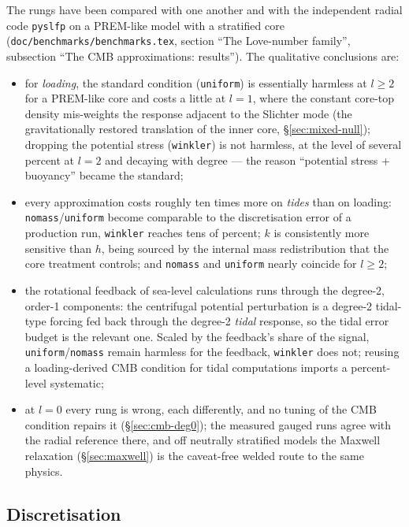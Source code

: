 \documentclass[11pt]{article}
\numberwithin{equation}{section}
\theoremstyle{remark}
\newcommand{\code}[1]{\texttt{#1}}
\begin{document}
The rungs have been compared with one another and with the independent
radial code \code{pyslfp} on a PREM-like model with a stratified core
(\code{doc/benchmarks/benchmarks.tex}, section ``The Love-number family'', subsection
``The CMB approximations: results''). The qualitative conclusions are:
\begin{itemize}
\item for \emph{loading}, the standard condition (\code{uniform}) is
  essentially harmless at $l\ge2$ for a PREM-like core and costs a little
  at $l=1$, where the constant core-top density mis-weights the response
  adjacent to the Slichter mode (the gravitationally restored translation
  of the inner core, \S\ref{sec:mixed-null}); dropping the potential
  stress (\code{winkler}) is not harmless, at the level of several percent
  at $l=2$ and decaying with degree --- the reason ``potential stress +
  buoyancy'' became the standard;
\item every approximation costs roughly ten times more on \emph{tides} than
  on loading: \code{nomass}/\code{uniform} become comparable to the
  discretisation error of a production run, \code{winkler} reaches tens of
  percent; $k$ is consistently more sensitive than $h$, being sourced by
  the internal mass redistribution that the core treatment controls; and
  \code{nomass} and \code{uniform} nearly coincide for $l\ge2$;
\item the rotational feedback of sea-level calculations runs through the
  degree-2, order-1 components: the centrifugal potential perturbation is a
  degree-2 tidal-type forcing fed back through the degree-2 \emph{tidal}
  response, so the tidal error budget is the relevant one. Scaled by the
  feedback's share of the signal, \code{uniform}/\code{nomass} remain
  harmless for the feedback, \code{winkler} does not; reusing a
  loading-derived CMB condition for tidal computations imports a
  percent-level systematic;
\item at $l=0$ every rung is wrong, each differently, and no tuning of
  the CMB condition repairs it (\S\ref{sec:cmb-deg0}); the measured gauged
  runs agree with the radial reference there, and off neutrally
  stratified models the Maxwell relaxation (\S\ref{sec:maxwell}) is the
  caveat-free welded route to the same physics.
\end{itemize}

\subsection{Discretisation}
\end{document}
